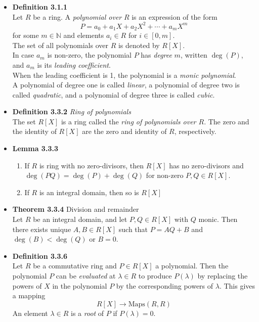 \documentclass[11pt,a4paper]{article}
\begin{document}
\begin{itemize}

    \item \textbf{Definition 3.1.1} \\
        Let $R$ be a ring.
        A \emph{polynomial over} $R$ is an expression of the form
        \[
            P = a_0 + a_1X + a_2{X^2} + \cdots + a_m{X^m}
        \]
        for some $m \in \mathbb{N}$ and elements $a_i \in R$ for $i \in [0,m]$.\\
        The set of all polynomials over $R$ is denoted by $R[X]$.\\
        In case $a_m$ is non-zero, the polynomial $P$ has \emph{degree} $m$, written $\deg(P)$, and
        $a_m$ is its \emph{leading coefficient}. \\
        When the leading coefficient is 1, the polynomial is a \emph{monic polynomial}.\\
        A polynomial of degree one is called \emph{linear},
        a polynomial of degree two is called \emph{quadratic},
        and a polynomial of degree three is called \emph{cubic}.

    \item \textbf{Definition 3.3.2} \emph{Ring of polynomials} \\
        The set $R[X]$ is a ring called the \emph{ring of polynomials over $R$}.
        The zero and the identity of $R[X]$ are the zero and identity of $R$, respectively.

    \item \textbf{Lemma 3.3.3}
        \begin{enumerate}
            \item If $R$ is ring with no zero-divisors, then $R[X]$ has no zero-divisors and
                $\deg(PQ) = \deg(P) + \deg(Q)$ for non-zero $P,Q \in R[X]$.
            \item If $R$ is an integral domain, then so is $R{[X]}$
        \end{enumerate}

    \item \textbf{Theorem 3.3.4} Division and remainder \\
        Let $R$ be an integral domain, and let $P,Q \in R[X]$ with $Q$ monic.
        Then there exists unique $A,B \in R{[X]}$ such that
        $P=AQ + B$ and $\deg(B) < \deg(Q)$ or $B=0$.

    \item \textbf{Definition 3.3.6} \\
        Let $R$ be a commutative ring and $P \in R[X]$ a polynomial.
        Then the polynomial $P$ can be \emph{evaluated} at $\lambda \in R$ to produce $P(\lambda)$
        by replacing the powers of $X$ in the polynomial $P$ by the corresponding powers of
        $\lambda$.
        This gives a mapping
        \[
            R[X] \to \mathrm{Maps}(R,R)
        \]
        An element $\lambda \in R$ is a \emph{root} of $P$ if $P(\lambda) = 0$.


\end{itemize}
\end{document}
